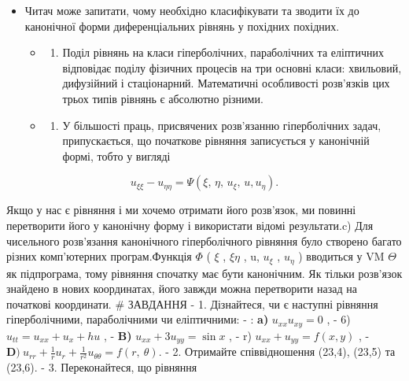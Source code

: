 \documentclass[
  ukrainian,
]{article}
\providecommand{\tightlist}{%
  \setlength{\itemsep}{0pt}\setlength{\parskip}{0pt}}
\begin{document}
\begin{itemize}
\tightlist
\item
  Читач може запитати, чому необхідно класифікувати та зводити їх до
  канонічної форми диференціальних рівнянь у похідних похідних.

  \begin{itemize}
  \tightlist
  \item
    \begin{enumerate}
    \def\labelenumi{\alph{enumi})}
    \tightlist
    \item
      Поділ рівнянь на класи гіперболічних, параболічних та еліптичних
      відповідає поділу фізичних процесів на три основні класи:
      хвильовий, дифузійний і стаціонарний. Математичні особливості
      розв'язків цих трьох типів рівнянь є абсолютно різними.
    \end{enumerate}
  \item
    \begin{enumerate}
    \def\labelenumi{\alph{enumi})}
    \setcounter{enumi}{1}
    \tightlist
    \item
      У більшості праць, присвячених розв'язанню гіперболічних задач,
      припускається, що початкове рівняння записується у канонічній
      формі, тобто у вигляді
    \end{enumerate}
  \end{itemize}
\end{itemize}

\[
u_{\xi\xi} - u_{\eta\eta} = \Psi(\xi, \, \eta, \, u_{\xi}, \, u, u_{\eta}).
\]

Якщо у нас є рівняння і ми хочемо отримати його розв'язок, ми повинні
перетворити його у канонічну форму і використати відомі результати.c)
Для чисельного розв'язання канонічного гіперболічного рівняння було
створено багато різних комп'ютерних програм.Функція \(\Phi\) ( \(\xi\) ,
\(\xi \eta\) , u, \(u_{\xi}\) , \(u_{\eta}\) ) вводиться у VM \(\Theta\)
як підпрограма, тому рівняння спочатку має бути канонічним. Як тільки
розв'язок знайдено в нових координатах, його завжди можна перетворити
назад на початкові координати. \# ЗАВДАННЯ - 1. Дізнайтеся, чи є
наступні рівняння гіперболічними, параболічними чи еліптичними: - :
\textbf{a)} \(u_{xx} u_{xy} = 0\) , - 6) \(u_{tt} = u_{xx} + u_x + hu\)
, - \textbf{B)} \(u_{xx} + 3u_{yy} = \sin x\) , - r)
\(u_{xx} + u_{yy} = f(x, y)\) , -
\(\mathbf{D} ) \ u_{rr} + \frac{1}{r} u_r + \frac{1}{r^2} u_{\theta \theta} = f(r, \ \theta).\)
- 2. Отримайте співвідношення (23,4), (23,5) та (23,6). - 3.
Переконайтеся, що рівняння
\end{document}
